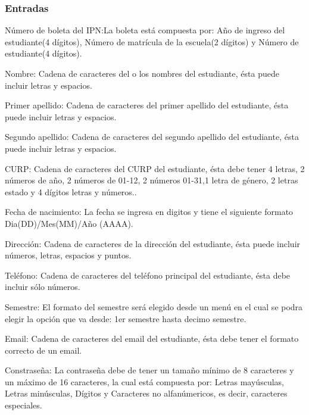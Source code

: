 \subsubsection{Entradas}
	\begin{Citemize}
		\item Número de boleta del IPN:La boleta está compuesta por: Año de ingreso del estudiante(4 dígitos), Número de matrícula de la escuela(2 dígitos) y Número de estudiante(4 dígitos).
		\item Nombre: Cadena de caracteres del o los nombres del estudiante, ésta puede incluir letras y espacios. 
		\item Primer apellido: Cadena de caracteres del primer apellido del estudiante, ésta puede incluir letras y espacios. 
		\item Segundo apellido: Cadena de caracteres del segundo apellido del estudiante, ésta puede incluir letras y espacios. 
		\item CURP: Cadena de caracteres del CURP del estudiante, ésta debe tener 4 letras, 2 números de año, 2 números de 01-12, 2 números 01-31,1 letra de género, 2 letras estado y 4 dígitos letras y números.. 
		\item Fecha de nacimiento: La fecha se ingresa en digitos y tiene el siguiente formato Dia(DD)/Mes(MM)/Año (AAAA).
		\item Dirección: Cadena de caracteres de la dirección del estudiante, ésta puede incluir números, letras, espacios y puntos. 
		\item Teléfono: Cadena de caracteres del teléfono principal del estudiante, ésta debe incluir sólo números. 
		\item Semestre: El formato del semestre será elegido desde un menú en el cual se podra elegir la opción que va desde: 1er semestre hasta decimo semestre.
		\item Email: Cadena de caracteres del email del estudiante, ésta debe tener el formato correcto de un email. 
		\item Constraseña: La contraseña debe de tener un tamaño mínimo de 8 caracteres y un máximo de 16 caracteres, la cual está compuesta por: Letras mayúsculas, Letras minúsculas, Dígitos y Caracteres no alfanúmericos, es decir, caracteres especiales.

	\end{Citemize}



